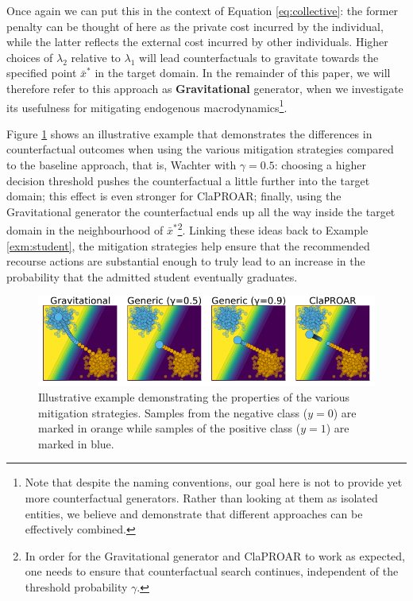 \documentclass[conference,final,]{IEEEtran}
\theoremstyle{definition}
\theoremstyle{definition}
\theoremstyle{definition}
\theoremstyle{definition}
\theoremstyle{remark}
\begin{document}
Once again we can put this in the context of Equation \eqref{eq:collective}: the former penalty can be thought of here as the private cost incurred by the individual, while the latter reflects the external cost incurred by other individuals. Higher choices of \(\lambda_2\) relative to \(\lambda_1\) will lead counterfactuals to gravitate towards the specified point \(\bar{x}^*\) in the target domain. In the remainder of this paper, we will therefore refer to this approach as \textbf{Gravitational} generator, when we investigate its usefulness for mitigating endogenous macrodynamics\footnote{Note that despite the naming conventions, our goal here is not to provide yet more counterfactual generators. Rather than looking at them as isolated entities, we believe and demonstrate that different approaches can be effectively combined.}.

Figure \ref{fig:mitigation} shows an illustrative example that demonstrates the differences in counterfactual outcomes when using the various mitigation strategies compared to the baseline approach, that is, Wachter with \(\gamma=0.5\): choosing a higher decision threshold pushes the counterfactual a little further into the target domain; this effect is even stronger for ClaPROAR; finally, using the Gravitational generator the counterfactual ends up all the way inside the target domain in the neighbourhood of \(\bar{x}^*\)\footnote{In order for the Gravitational generator and ClaPROAR to work as expected, one needs to ensure that counterfactual search continues, independent of the threshold probability \(\gamma\).}. Linking these ideas back to Example \ref{exm:student}, the mitigation strategies help ensure that the recommended recourse actions are substantial enough to truly lead to an increase in the probability that the admitted student eventually graduates.

\begin{figure}

{\centering \includegraphics[width=0.9\linewidth]{www/mitigation} 

}

\caption{Illustrative example demonstrating the properties of the various mitigation strategies. Samples from the negative class ($y=0$) are marked in orange while samples of the positive class ($y=1$) are marked in blue.}\label{fig:mitigation}
\end{figure}
\end{document}
